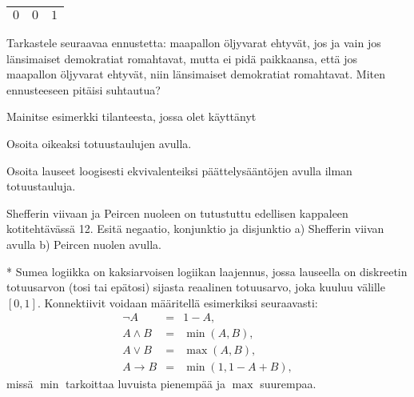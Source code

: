 \begin{kotitehtavasivu}
\begin{tehtava}
\begin{center}
\begin{tabular}{|c|c|c|}
	$0$ & $0$ & $1$\\ \hline
	\end{tabular}
	\end{center}
\end{tehtava}

\begin{tehtava}
	Tarkastele seuraavaa ennustetta: maapallon öljyvarat ehtyvät, jos ja vain jos länsimaiset demokratiat romahtavat, mutta ei pidä paikkaansa, että jos maapallon
	öljyvarat ehtyvät, niin länsimaiset demokratiat romahtavat. Miten ennusteeseen pitäisi suhtautua?
\end{tehtava}

\begin{tehtava}
	Mainitse esimerkki tilanteesta, jossa olet käyttänyt
\end{tehtava}

\begin{tehtava}
	Osoita
	oikeaksi totuustaulujen avulla.
\end{tehtava}

\begin{tehtava}
	Osoita lauseet loogisesti ekvivalenteiksi
	päättelysääntöjen avulla ilman totuustauluja.
\end{tehtava}

\begin{tehtava}
	Shefferin viivaan ja Peircen nuoleen on tutustuttu
	edellisen kappaleen kotitehtävässä 12. Esitä negaatio,
	konjunktio ja disjunktio a) Shefferin viivan avulla b)
	Peircen nuolen avulla.
\end{tehtava}

\begin{tehtava}
	* Sumea logiikka on kaksiarvoisen logiikan
	laajennus, jossa lauseella on diskreetin totuusarvon
	(tosi tai epätosi) sijasta reaalinen totuusarvo, joka
	kuuluu välille $[0, 1]$. Konnektiivit voidaan määritellä
	esimerkiksi seuraavasti:
	\[
	\begin{array}{rcl}
	\lnot A &=& 1-A,\\
	A\land B &=& \min(A, B),\\
	A\lor B &=& \max(A, B),\\
	A\to B
	&=& \min(1, 1-A+B),
	\end{array}
	\]
	missä $\min$ tarkoittaa luvuista pienempää ja $\max$
	suurempaa.


\end{tehtava}
\end{kotitehtavasivu}
